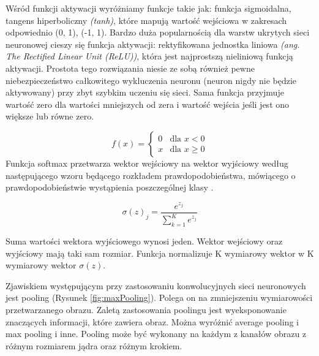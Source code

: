 \documentclass[a4paper,12pt]{article}
\begin{document}
			Wśród funkcji aktywacji wyróżniamy funkcje takie jak: funkcja sigmoidalna,  tangens hiperboliczny \textit{(tanh)}, które mapują wartość wejściowa w zakresach odpowiednio (0, 1), (-1, 1). 
			Bardzo duża popularnością dla warstw ukrytych sieci neuronowej cieszy się funkcja aktywacji: rektyfikowana jednostka liniowa 
			\textit{(ang. The Rectified Linear Unit (ReLU))}, która jest najprostszą nieliniową funkcją aktywacji. Prostota tego rozwiązania niesie ze sobą również pewne niebezpieczeństwo całkowitego wykluczenia neuronu (neuron nigdy nie będzie aktywowany) przy zbyt szybkim uczeniu się sieci.
			Sama funkcja przyjmuje wartość zero dla wartości mniejszych od zera i wartość wejścia jeśli jest ono większe lub równe zero.
			
			\begin{displaymath}
                f(x) =  
                \left\{
                    \begin{array}{ll}
                        0 & \textrm{dla } x < 0 \\
                        x & \textrm{dla } x \geqslant 0
                    \end{array}
                \right.
            \end{displaymath}
			Funkcja softmax przetwarza wektor wejściowy na wektor wyjściowy według następującego wzoru będącego rozkładem prawdopodobieństwa, 
			mówiącego o prawdopodobieństwie wystąpienia poszczególnej klasy \cite{13}. 
        \begin{center}
			\begin{displaymath}
				\sigma (z)_{j} = \frac{e^{z_{j}}}{ \sum_{k=1}^K e^{z_{j}}}
			\end{displaymath}
			\end{center}
			Suma wartości wektora wyjściowego wynosi jeden. Wektor wejściowy oraz wyjściowy mają taki sam rozmiar. Funkcja normalizuje K wymiarowy wektor w K wymiarowy wektor  
			$ \sigma (z)$. 
        
	    Zjawiskiem występującym przy zastosowaniu konwolucyjnych sieci neuronowych jest pooling (Rysunek \ref{fig:maxPooling}). Polega on na zmniejszeniu wymiarowości 
			przetwarzanego obrazu. Zaletą zastosowania poolingu jest wyeksponowanie znaczących informacji, które zawiera obraz. Można wyróżnić average 
			pooling i max pooling i inne. Pooling może być wykonany na każdym z kanałów obrazu z różnym rozmiarem jądra oraz różnym krokiem. 
	 
\end{document}

